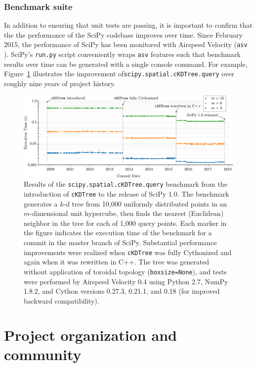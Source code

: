 \documentclass[fleqn,10pt]{wlscirep}
\begin{document}
\subsubsection*{Benchmark suite}

In addition to ensuring that unit tests are passing, it is important to confirm that the
the performance of the SciPy codebase improves over time. Since February 2015, the
performance of SciPy has been monitored with Airspeed Velocity (\texttt{asv} \cite{asvref}).
SciPy's \texttt{run.py} script conveniently wraps \texttt{asv} features such that benchmark 
results over time can be generated with a single console command. For example,
Figure~\ref{fig:asvbench} illustrates the improvement of\texttt{scipy.spatial.cKDTree.query}
over roughly nine years of project history.

\begin{figure}[H]
\centering
\includegraphics[width=\textwidth]{static/asv}
\caption{Results of the \texttt{scipy.spatial.cKDTree.query} benchmark from the introduction of \texttt{cKDTree} to the release of SciPy 1.0. The benchmark generates a $k$-d tree from 10,000 uniformly distributed points in an $m$-dimensional unit hypercube, then finds the nearest (Euclidean) neighbor in the tree for each of 1,000 query points. Each marker in the figure indicates the execution time of the benchmark for a commit in the master branch of SciPy. Substantial performance improvements were realized when \texttt{cKDTree} was fully Cythonized and again when it was rewritten in C++. The tree was generated without application of toroidal topology (\texttt{boxsize=None}), and tests were performed by Airspeed Velocity 0.4 using Python 2.7, NumPy 1.8.2, and Cython versions 0.27.3, 0.21.1, and 0.18 (for improved backward compatibility).}
\label{fig:asvbench}
\end{figure}

\section*{Project organization and community}
\end{document}
